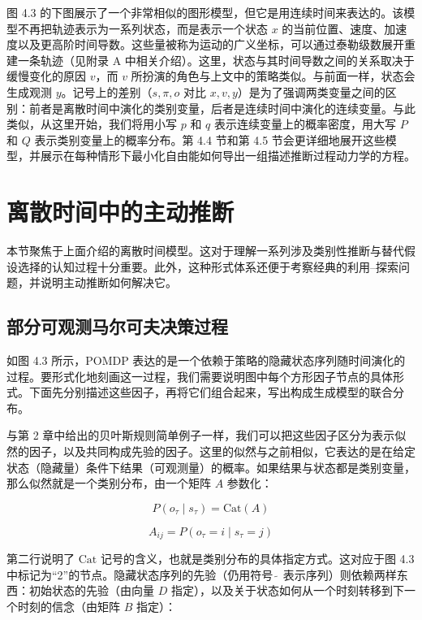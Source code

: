 图 4.3 的下图展示了一个非常相似的图形模型，但它是用连续时间来表达的。该模型不再把轨迹表示为一系列状态，而是表示一个状态 $x$ 的当前位置、速度、加速度以及更高阶时间导数。这些量被称为运动的广义坐标，可以通过泰勒级数展开重建一条轨迹（见附录 A 中相关介绍）。这里，状态与其时间导数之间的关系取决于缓慢变化的原因 $v$，而 $v$ 所扮演的角色与上文中的策略类似。与前面一样，状态会生成观测 $y$。记号上的差别（$s,\pi,o$ 对比 $x,v,y$）是为了强调两类变量之间的区别：前者是离散时间中演化的类别变量，后者是连续时间中演化的连续变量。与此类似，从这里开始，我们将用小写 $p$ 和 $q$ 表示连续变量上的概率密度，用大写 $P$ 和 $Q$ 表示类别变量上的概率分布。第 4.4 节和第 4.5 节会更详细地展开这些模型，并展示在每种情形下最小化自由能如何导出一组描述推断过程动力学的方程。

\section{离散时间中的主动推断}

本节聚焦于上面介绍的离散时间模型。这对于理解一系列涉及类别性推断与替代假设选择的认知过程十分重要。此外，这种形式体系还便于考察经典的利用--探索问题，并说明主动推断如何解决它。

\subsection{部分可观测马尔可夫决策过程}

如图 4.3 所示，POMDP 表达的是一个依赖于策略的隐藏状态序列随时间演化的过程。要形式化地刻画这一过程，我们需要说明图中每个方形因子节点的具体形式。下面先分别描述这些因子，再将它们组合起来，写出构成生成模型的联合分布。

与第 2 章中给出的贝叶斯规则简单例子一样，我们可以把这些因子区分为表示似然的因子，以及共同构成先验的因子。这里的似然与之前相似，它表达的是在给定状态（隐藏量）条件下结果（可观测量）的概率。如果结果与状态都是类别变量，那么似然就是一个类别分布，由一个矩阵 $A$ 参数化：

\begin{equation}
P(o_\tau \mid s_\tau) = \mathrm{Cat}(A)
\tag{4.5}
\end{equation}

\begin{equation}
A_{ij} = P(o_\tau = i \mid s_\tau = j)
\tag{4.5}
\end{equation}

第二行说明了 $\mathrm{Cat}$ 记号的含义，也就是类别分布的具体指定方式。这对应于图 4.3 中标记为“2”的节点。隐藏状态序列的先验（仍用符号 $\tilde{\ }$ 表示序列）则依赖两样东西：初始状态的先验（由向量 $D$ 指定），以及关于状态如何从一个时刻转移到下一个时刻的信念（由矩阵 $B$ 指定）：


